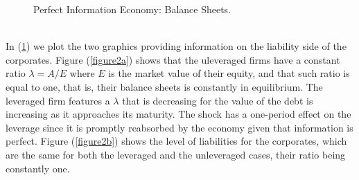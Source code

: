 \documentclass[11pt]{article}
\begin{document}
\begin{figure}[h!]
\centering
{}\quad
{}
 \caption{Perfect Information Economy: Balance Sheets.} \label{figure2}
\end{figure}\\
In (\ref{figure2}) we plot the two graphics providing information on the liability side of the corporates. Figure (\ref{figure2a}) shows that the uleveraged firms have a constant ratio $\lambda=A/E$ where $E$ is the market value of their equity, and that such ratio is equal to one, that is, their balance sheets is constantly in equilibrium. The leveraged firm features a $\lambda$ that is decreasing for the value of the debt is increasing as it approaches its maturity. The shock has a one-period effect on the leverage since it is promptly reabsorbed by the economy given that information is perfect. Figure (\ref{figure2b}) shows the level of liabilities for the corporates, which are the same for both the leveraged and the unleveraged cases, their ratio being constantly one.
\end{document}
